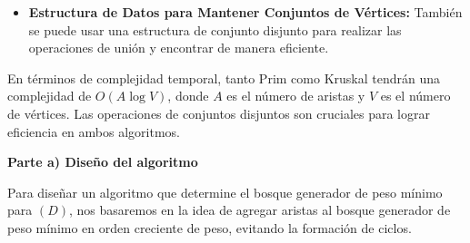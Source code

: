 \documentclass[answers, 11pt]{exam}
\begin{document}
\begin{questions}
\begin{solution}
\begin{itemize}
    \item \textbf{Estructura de Datos para Mantener Conjuntos de Vértices:}
  También se puede usar una estructura de conjunto disjunto para 
  realizar las operaciones de unión y encontrar de manera eficiente.
\end{itemize}

En términos de complejidad temporal, tanto Prim como Kruskal tendrán una complejidad 
de $O(A \log V)$, donde $A$ es el número de aristas y $V$ es el número de vértices. 
Las operaciones de conjuntos disjuntos son cruciales para lograr eficiencia en ambos algoritmos.

  \end{solution}
  

\begin{solution}
  \textbf{Parte a) Diseño del algoritmo}

Para diseñar un algoritmo que determine el bosque generador de peso mínimo para $(D)$, nos basaremos en la idea de agregar aristas al bosque generador de peso mínimo en orden creciente de peso, evitando la formación de ciclos.


\end{solution}
\end{questions}
\end{document}

